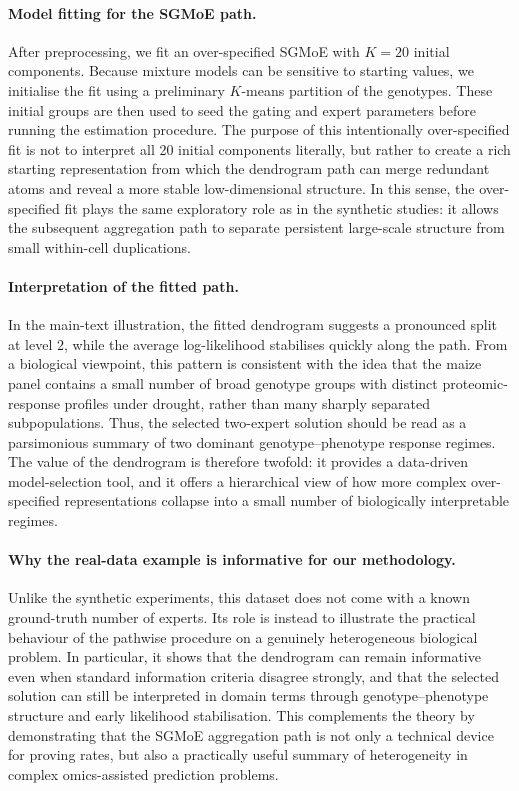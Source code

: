 \documentclass[twoside]{article}
\theoremstyle{plain}
\theoremstyle{definition}
\theoremstyle{plain}
\begin{document}
\paragraph{Model fitting for the SGMoE path.}
After preprocessing, we fit an over-specified SGMoE with $K=20$ initial components. Because mixture models can be sensitive to starting values, we initialise the fit using a preliminary $K$-means partition of the genotypes. These initial groups are then used to seed the gating and expert parameters before running the estimation procedure. The purpose of this intentionally over-specified fit is not to interpret all 20 initial components literally, but rather to create a rich starting representation from which the dendrogram path can merge redundant atoms and reveal a more stable low-dimensional structure. In this sense, the over-specified fit plays the same exploratory role as in the synthetic studies: it allows the subsequent aggregation path to separate persistent large-scale structure from small within-cell duplications. 

\paragraph{Interpretation of the fitted path.}
In the main-text illustration, the fitted dendrogram suggests a pronounced split at level $2$, while the average log-likelihood stabilises quickly along the path. From a biological viewpoint, this pattern is consistent with the idea that the maize panel contains a small number of broad genotype groups with distinct proteomic-response profiles under drought, rather than many sharply separated subpopulations. Thus, the selected two-expert solution should be read as a parsimonious summary of two dominant genotype--phenotype response regimes. The value of the dendrogram is therefore twofold: it provides a data-driven model-selection tool, and it offers a hierarchical view of how more complex over-specified representations collapse into a small number of biologically interpretable regimes. 

\paragraph{Why the real-data example is informative for our methodology.}
Unlike the synthetic experiments, this dataset does not come with a known ground-truth number of experts. Its role is instead to illustrate the practical behaviour of the pathwise procedure on a genuinely heterogeneous biological problem. In particular, it shows that the dendrogram can remain informative even when standard information criteria disagree strongly, and that the selected solution can still be interpreted in domain terms through genotype--phenotype structure and early likelihood stabilisation. This complements the theory by demonstrating that the SGMoE aggregation path is not only a technical device for proving rates, but also a practically useful summary of heterogeneity in complex omics-assisted prediction problems.
\end{document}
